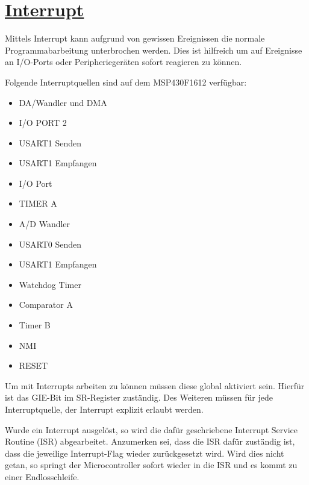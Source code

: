 \documentclass[11pt,german]{scrartcl}
\begin{document}

\clearpage
\section
{\href{http://cst.mi.fu-berlin.de/intern/19606-P-MPP/Aufgaben/040400.html}
{Interrupt}}

Mittels Interrupt kann aufgrund von gewissen Ereignissen die normale Programmabarbeitung unterbrochen werden.
Dies ist hilfreich um auf Ereignisse an I/O-Ports oder Peripheriegeräten sofort reagieren zu können.

Folgende Interruptquellen sind auf dem MSP430F1612 verfügbar:

\begin{itemize}
    \item DA/Wandler und DMA
    \item I/O PORT 2
    \item USART1 Senden
    \item USART1 Empfangen
    \item I/O Port
    \item TIMER A
    \item A/D Wandler
    \item USART0 Senden
    \item USART1 Empfangen
    \item Watchdog Timer
    \item Comparator A
    \item Timer B
    \item NMI
    \item RESET
\end{itemize}

Um mit Interrupts arbeiten zu können müssen diese global aktiviert sein.
Hierfür ist das GIE-Bit im SR-Register zuständig.
Des Weiteren müssen für jede Interruptquelle, der Interrupt explizit erlaubt werden.

Wurde ein Interrupt ausgelöst, so wird die dafür geschriebene Interrupt Service Routine (ISR) abgearbeitet. Anzumerken sei, dass die ISR dafür zuständig ist, dass die jeweilige Interrupt-Flag wieder zurückgesetzt wird.
Wird dies nicht getan, so springt der Microcontroller sofort wieder in die ISR und es kommt zu einer Endlosschleife.




\end{document}
